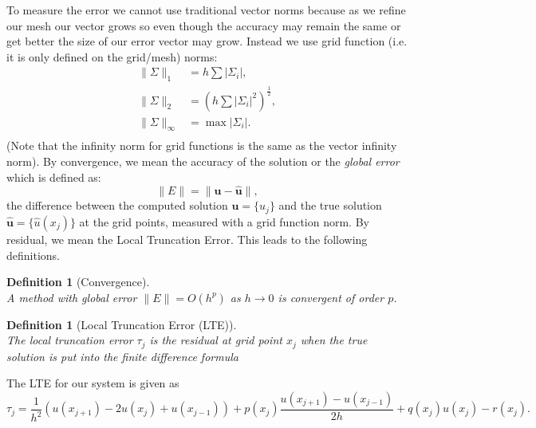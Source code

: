 \documentclass[12pt, a4paper]{article}
\newtheorem{definition}[thm]{Definition}
\theoremstyle{definition}
\theoremstyle{remark}
\numberwithin{equation}{section}
\begin{document}
To measure the error we cannot use traditional vector norms because as we refine our mesh our vector grows so even though the accuracy may remain the same or get better the size of our error vector may grow.
Instead we use grid function (i.e. it is only defined on the grid/mesh) norms:
\begin{align*}
\| \Sigma \|_1 &= h \sum|\Sigma_i|,\\
\| \Sigma \|_2 &= \left(h \sum|\Sigma_i|^2 \right)^{\frac{1}{2}},\\
\| \Sigma \|_\infty &= \operatorname{max}|\Sigma_i|. \\
\end{align*}
(Note that the infinity norm for grid functions is the same as the vector infinity norm).
By convergence, we mean the accuracy of the solution or the \emph{global error} which is defined as:
\begin{equation*}
 \| E \| =  \| \mathbf{u} - \mathbf{\hat{u}} \|, 
\end{equation*}
the difference between the computed solution $\mathbf{u} = \{u_j\}$ and the true solution \mbox{$\mathbf{\hat{u}} =\{\hat{u}(x_j)\}$} at the grid points, measured with a grid function norm. 
By residual, we mean the Local Truncation Error. This leads to the following definitions.

\begin{definition}[Convergence] \ \\
A method with global error $\| E\|=O(h^p)$ as $h \to 0$ is convergent of order $p$.
\end{definition} 


\begin{definition}[Local Truncation Error (LTE)] \ \\
The local truncation error $\tau_j$ is the residual at grid point $x_j$ when the true solution is put into the finite difference formula 
\end{definition}

The LTE for our system is given as
\begin{equation*}
\tau_j = \frac{1}{h^2}(u(x_{j+1})-2u(x_j)+u(x_{j-1}))+p(x_j)\frac{u(x_{j+1})-u(x_{j-1})}{2h}+q(x_j)u(x_j)-r(x_j).
\end{equation*}
\end{document}
